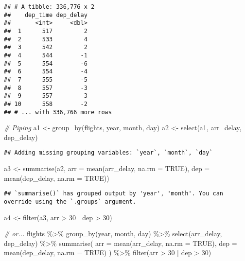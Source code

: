 \documentclass[
]{article}
\newenvironment{Shaded}{\begin{snugshade}}{\end{snugshade}}
\newcommand{\AttributeTok}[1]{\textcolor[rgb]{0.77,0.63,0.00}{#1}}
\newcommand{\CommentTok}[1]{\textcolor[rgb]{0.56,0.35,0.01}{\textit{#1}}}
\newcommand{\ConstantTok}[1]{\textcolor[rgb]{0.00,0.00,0.00}{#1}}
\newcommand{\DecValTok}[1]{\textcolor[rgb]{0.00,0.00,0.81}{#1}}
\newcommand{\FunctionTok}[1]{\textcolor[rgb]{0.00,0.00,0.00}{#1}}
\newcommand{\NormalTok}[1]{#1}
\newcommand{\OtherTok}[1]{\textcolor[rgb]{0.56,0.35,0.01}{#1}}
\newcommand{\SpecialCharTok}[1]{\textcolor[rgb]{0.00,0.00,0.00}{#1}}
\begin{document}
\begin{verbatim}
## # A tibble: 336,776 x 2
##    dep_time dep_delay
##       <int>     <dbl>
##  1      517         2
##  2      533         4
##  3      542         2
##  4      544        -1
##  5      554        -6
##  6      554        -4
##  7      555        -5
##  8      557        -3
##  9      557        -3
## 10      558        -2
## # ... with 336,766 more rows
\end{verbatim}

\begin{Shaded}
\begin{Highlighting}[]
\CommentTok{\# Piping}
\NormalTok{a1 }\OtherTok{\textless{}{-}} \FunctionTok{group\_by}\NormalTok{(flights, year, month, day)}
\NormalTok{a2 }\OtherTok{\textless{}{-}} \FunctionTok{select}\NormalTok{(a1, arr\_delay, dep\_delay)}
\end{Highlighting}
\end{Shaded}

\begin{verbatim}
## Adding missing grouping variables: `year`, `month`, `day`
\end{verbatim}

\begin{Shaded}
\begin{Highlighting}[]
\NormalTok{a3 }\OtherTok{\textless{}{-}} \FunctionTok{summarise}\NormalTok{(a2,}
  \AttributeTok{arr =} \FunctionTok{mean}\NormalTok{(arr\_delay, }\AttributeTok{na.rm =} \ConstantTok{TRUE}\NormalTok{),}
  \AttributeTok{dep =} \FunctionTok{mean}\NormalTok{(dep\_delay, }\AttributeTok{na.rm =} \ConstantTok{TRUE}\NormalTok{))}
\end{Highlighting}
\end{Shaded}

\begin{verbatim}
## `summarise()` has grouped output by 'year', 'month'. You can override using the `.groups` argument.
\end{verbatim}

\begin{Shaded}
\begin{Highlighting}[]
\NormalTok{a4 }\OtherTok{\textless{}{-}} \FunctionTok{filter}\NormalTok{(a3, arr }\SpecialCharTok{\textgreater{}} \DecValTok{30} \SpecialCharTok{|}\NormalTok{ dep }\SpecialCharTok{\textgreater{}} \DecValTok{30}\NormalTok{)}

\CommentTok{\# or...}
\NormalTok{flights }\SpecialCharTok{\%\textgreater{}\%}
  \FunctionTok{group\_by}\NormalTok{(year, month, day) }\SpecialCharTok{\%\textgreater{}\%}
  \FunctionTok{select}\NormalTok{(arr\_delay, dep\_delay) }\SpecialCharTok{\%\textgreater{}\%}
  \FunctionTok{summarise}\NormalTok{(}
    \AttributeTok{arr =} \FunctionTok{mean}\NormalTok{(arr\_delay, }\AttributeTok{na.rm =} \ConstantTok{TRUE}\NormalTok{),}
    \AttributeTok{dep =} \FunctionTok{mean}\NormalTok{(dep\_delay, }\AttributeTok{na.rm =} \ConstantTok{TRUE}\NormalTok{)}
\NormalTok{  ) }\SpecialCharTok{\%\textgreater{}\%}
  \FunctionTok{filter}\NormalTok{(arr }\SpecialCharTok{\textgreater{}} \DecValTok{30} \SpecialCharTok{|}\NormalTok{ dep }\SpecialCharTok{\textgreater{}} \DecValTok{30}\NormalTok{)}
\end{Highlighting}
\end{Shaded}
\end{document}
